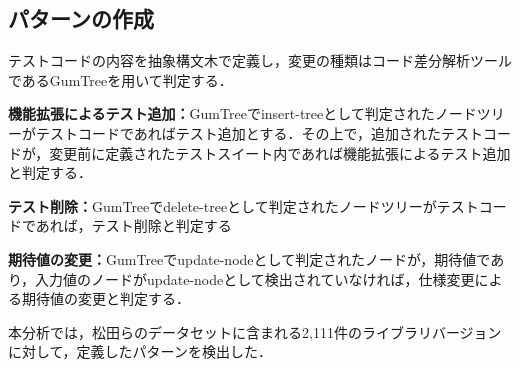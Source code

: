 \documentclass[T,J]{fose} %
\begin{document}
\vspace{-10pt}
\subsection{パターンの作成}\label{create_pattern}
テストコードの内容を抽象構文木で定義し，変更の種類はコード差分解析ツールであるGumTree\cite{gumtree}を用いて判定する．




\noindent\textbf{機能拡張によるテスト追加：}GumTreeでinsert-treeとして判定されたノードツリーがテストコードであればテスト追加とする．その上で，追加されたテストコードが，変更前に定義されたテストスイート内であれば機能拡張によるテスト追加と判定する．

\noindent\textbf{テスト削除：}GumTreeでdelete-treeとして判定されたノードツリーがテストコードであれば，テスト削除と判定する

\noindent\textbf{期待値の変更：}GumTreeでupdate-nodeとして判定されたノードが，期待値であり，入力値のノードがupdate-nodeとして検出されていなければ，仕様変更による期待値の変更と判定する．

本分析では，松田らのデータセットに含まれる2,111件のライブラリバージョンに対して，定義したパターンを検出した．

\end{document}
